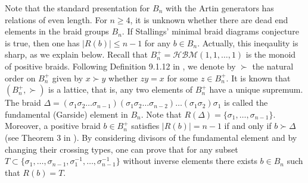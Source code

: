 \documentclass[11pt]{amsart}
\theoremstyle{plain}
\theoremstyle{definition}
\numberwithin{equation}{section}
\begin{document}
Note that the standard presentation for $B_n$ with the Artin generators has relations of even length. For $n\geq 4$, it is unknown whether there are dead end elements in the braid groups $B_n$. If Stallings' minimal braid diagrams conjecture is true, then one has $|R(b)| \leq n-1$ for any $b \in B_n$. Actually, this ineqaulity is sharp, as we explain below. Recall that $B_n^+ = \mathcal{HBM}(1, 1, \ldots, 1)$ is the monoid of positive braids. Following Definition 9.1.12 in \cite{WPG}, we denote by $\succ$ the natural order on $B_n^+$ given by $x \succ y$ whether $zy = x$ for some $z \in B_n^+$. It is known that $(B_n^+, \succ)$ is a lattice, that is, any two elements of $B_n^+$ have a unique supremum. The braid $\Delta = (\sigma_1\sigma_2\ldots \sigma_{n-1})(\sigma_1\sigma_2\ldots \sigma_{n-2}) \ldots (\sigma_1\sigma_2)\sigma_1$ is called the fundamental (Garside) element in $B_n$.
Note that $R(\Delta) = \{\sigma_1, \ldots, \sigma_{n-1}\}$. 
Moreover, a positive braid $b \in B_n^+$ satisfies $|R(b)| = n-1$ if and only if $b \succ \Delta$ (see Theorem 3 in \cite{Garside}). By considering divisors of the fundamental element and by changing their crossing types, one can prove that for any subset $T \subset \{\sigma_1, \ldots, \sigma_{n-1}, \sigma_1^{-1}, \ldots, \sigma_{n-1}^{-1}\}$ without inverse elements there exists $b \in B_n$ such that $R(b) = T$.
\end{document}
